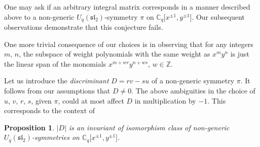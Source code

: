 \documentclass[10pt,a4paper]{amsart}
\numberwithin{equation}{section}
\newtheorem{Proposition}[Theorem]{Proposition}
 { \theoremstyle{definition}
\newtheorem{Definition}[Theorem]{Definition}
\newtheorem{Remark}[Theorem]{Remark} }
\begin{document}
One may ask if an arbitrary integral matrix corresponds in a manner described above to a non-generic $U_q(\mathfrak{sl}_2)$-symmetry $\pi$ on $\mathbb{C}_q\big[x^{\pm 1},y^{\pm 1}\big]$. Our subsequent observations demonstrate that this conjecture fails.

One more trivial consequence of our choices is in observing that for any integers $m$, $n$, the subspace of weight polynomials with the same weight as $x^my^n$ is just the linear span of the monomials $x^{m+wr}y^{n+ws}$, $w\in\mathbb{Z}$.

Let us introduce the {\it discriminant} $D=rv-su$ of a non-generic symmetry $\pi$. It follows from our assumptions that $D\ne 0$. The above ambiguities in the choice of $u$, $v$, $r$, $s$, given $\pi$, could at most affect $D$ in multiplication by $-1$. This corresponds to the context of

\begin{Proposition}\label{D_inv}$|D|$ is an invariant of isomorphism class of non-generic $U_q(\mathfrak{sl}_2)$-symmetries on $\mathbb{C}_q\big[x^{\pm 1},y^{\pm 1}\big]$.
\end{Proposition}
\end{document}
